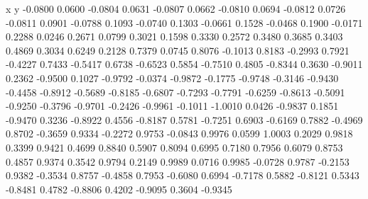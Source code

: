 	x y   
   -0.0800    0.0600
   -0.0804    0.0631
   -0.0807    0.0662
   -0.0810    0.0694
   -0.0812    0.0726
   -0.0811    0.0901
   -0.0788    0.1093
   -0.0740    0.1303
   -0.0661    0.1528
   -0.0468    0.1900
   -0.0171    0.2288
    0.0246    0.2671
    0.0799    0.3021
    0.1598    0.3330
    0.2572    0.3480
    0.3685    0.3403
    0.4869    0.3034
    0.6249    0.2128
    0.7379    0.0745
    0.8076   -0.1013
    0.8183   -0.2993
    0.7921   -0.4227
    0.7433   -0.5417
    0.6738   -0.6523
    0.5854   -0.7510
    0.4805   -0.8344
    0.3630   -0.9011
    0.2362   -0.9500
    0.1027   -0.9792
   -0.0374   -0.9872
   -0.1775   -0.9748
   -0.3146   -0.9430
   -0.4458   -0.8912
   -0.5689   -0.8185
   -0.6807   -0.7293
   -0.7791   -0.6259
   -0.8613   -0.5091
   -0.9250   -0.3796
   -0.9701   -0.2426
   -0.9961   -0.1011
   -1.0010    0.0426
   -0.9837    0.1851
   -0.9470    0.3236
   -0.8922    0.4556
   -0.8187    0.5781
   -0.7251    0.6903
   -0.6169    0.7882
   -0.4969    0.8702
   -0.3659    0.9334
   -0.2272    0.9753
   -0.0843    0.9976
    0.0599    1.0003
    0.2029    0.9818
    0.3399    0.9421
    0.4699    0.8840
    0.5907    0.8094
    0.6995    0.7180
    0.7956    0.6079
    0.8753    0.4857
    0.9374    0.3542
    0.9794    0.2149
    0.9989    0.0716
    0.9985   -0.0728
    0.9787   -0.2153
    0.9382   -0.3534
    0.8757   -0.4858
    0.7953   -0.6080
    0.6994   -0.7178
    0.5882   -0.8121
    0.5343   -0.8481
    0.4782   -0.8806
    0.4202   -0.9095
    0.3604   -0.9345